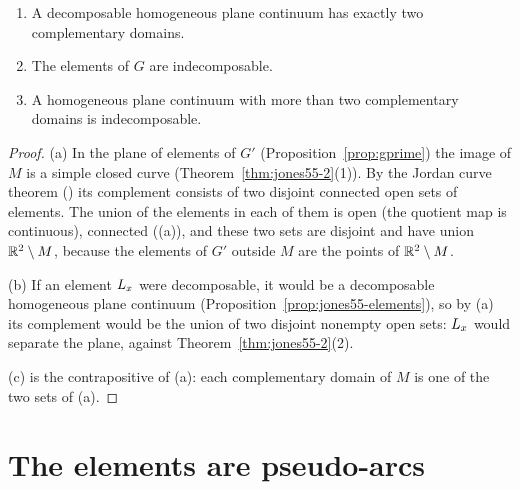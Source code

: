 
\begin{corollary}\label{cor:jones55-remarks}
\leavevmode
\begin{enumerate}[label=(\alph*)]
\item A decomposable homogeneous plane continuum has exactly two complementary domains.
\item The elements of $G$ are indecomposable.
\item A homogeneous plane continuum with more than two complementary domains is indecomposable.
\end{enumerate}
\end{corollary}

\begin{proof}
(a) In the plane of elements of $G'$ (Proposition~\ref{prop:gprime}) the image of $M$ is a simple closed curve (Theorem~\ref{thm:jones55-2}(1)). By the
Jordan curve theorem () its complement consists of two disjoint connected open sets of elements. The union of the elements in each
of them is open (the quotient map is continuous), connected ((a)), and these two sets are disjoint and have union $\mathbb{R}^2\setminus M$, because
the elements of $G'$ outside $M$ are the points of $\mathbb{R}^2\setminus M$.

(b) If an element $L_{x}$ were decomposable, it would be a decomposable homogeneous plane continuum (Proposition~\ref{prop:jones55-elements}), so by (a) its complement
would be the union of two disjoint nonempty open sets: $L_{x}$ would separate the plane, against Theorem~\ref{thm:jones55-2}(2).

(c) is the contrapositive of (a): each complementary domain of $M$ is one of the two sets of (a).
\end{proof}


\section{The elements are pseudo-arcs}

